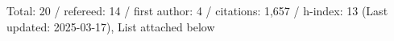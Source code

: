Total: 20 / refereed: 14 / first author: 4 / citations: 1,657 / h-index: 13 (Last updated: 2025-03-17), List attached below